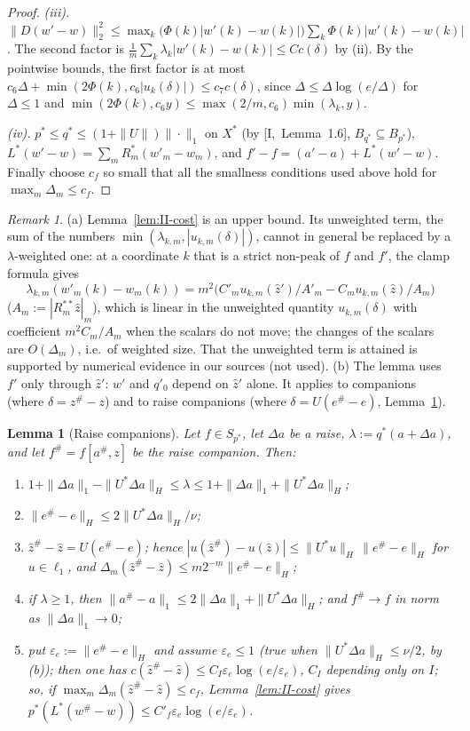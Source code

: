 \documentclass[10pt]{amsart}
\newtheorem{lemma}[theorem]{Lemma}
\theoremstyle{definition}
\theoremstyle{remark}
\newtheorem{remark}[theorem]{Remark}
\newcommand{\zh}{\hat z}
\begin{document}
\begin{proof}
\emph{(iii).}  $\|D(w'-w)\|_2^2\le\max_k\big(\Phi(k)|w'(k)-w(k)|\big)\sum_k
\Phi(k)|w'(k)-w(k)|$.  The second factor is $\frac1m\sum_k\lambda_k|w'(k)-
w(k)|\le C c(\delta)$ by (ii).  By the pointwise bounds, the first factor is
at most $c_6\Delta+\min(2\Phi(k),c_6|u_k(\delta)|)\le c_7c(\delta)$, since
$\Delta\le\Delta\log(e/\Delta)$ for $\Delta\le1$ and $\min(2\Phi(k),c_6y)\le
\max(2/m,c_6)\min(\lambda_k,y)$.

\emph{(iv).}  $p^*\le q^*\le(1+\|U\|)\|\cdot\|_1$ on $X^*$ (by
[I,~Lemma~1.6], $B_{q^*}\subseteq B_{p^*}$), $L^*(w'-w)=\sum_mR_m^*(w'_m-w_m)$,
and $f'-f=(a'-a)+L^*(w'-w)$.  Finally choose $c_f$ so small that all the
smallness conditions used above hold for $\max_m\Delta_m\le c_f$.
\end{proof}

\begin{remark}\label{rem:II-cost}
(a) Lemma~\ref{lem:II-cost} is an upper bound.  Its unweighted term,
the sum of the numbers $\min(\lambda_{k,m},|u_{k,m}(\delta)|)$, cannot in
general be replaced by a $\lambda$-weighted one: at a coordinate $k$ that is a strict non-peak of
$f$ and $f'$, the clamp formula gives
\[
 \lambda_{k,m}(w'_m(k)-w_m(k))=m^2\big(C'_mu_{k,m}(\zh')/A'_m-C_mu_{k,m}(\zh)/
 A_m\big)
\]
\textup{(}$A_m:=|R_m^{**}\zh|_m$\textup{)}, which is linear in the
unweighted quantity $u_{k,m}(\delta)$ with coefficient $m^2C_m/A_m$ when the
scalars do not move; the changes of the scalars are $O(\Delta_m)$, i.e.\ of
weighted size.  That the unweighted term is attained is supported by
numerical evidence in our sources (not used).
(b) The lemma uses $f'$ only through $\zh'$: $w'$ and $q'_0$ depend on $\zh'$
alone.  It applies to companions (where $\delta=z^\#-z$) and to raise
companions (where $\delta=U(e^\#-e)$, Lemma~\ref{lem:II-raise}).
\end{remark}

\begin{lemma}[Raise companions]\label{lem:II-raise}
Let $f\in S_{p^*}$, let $\Delta a$ be a raise, $\lambda:=q^*(a+\Delta a)$, and
let $f^\#=f[a^\#,z]$ be the raise companion.  Then:
\begin{enumerate}
\item[(a)] $1+\|\Delta a\|_1-\|U^*\Delta a\|_H\le\lambda\le1+\|\Delta a\|_1+
\|U^*\Delta a\|_H$;
\item[(b)] $\|e^\#-e\|_H\le2\|U^*\Delta a\|_H/\nu$;
\item[(c)] $\zh^\#-\zh=U(e^\#-e)$; hence $|u(\zh^\#)-u(\zh)|\le\|U^*u\|_H\,
\|e^\#-e\|_H$ for $u\in\ell_1$, and $\Delta_m(\zh^\#-\zh)\le m2^{-m}\|e^\#-e\|_H$;
\item[(d)] if $\lambda\ge1$, then $\|a^\#-a\|_1\le2\|\Delta a\|_1+\|U^*\Delta
a\|_H$; and $f^\#\to f$ in norm as $\|\Delta a\|_1\to0$;
\item[(e)] put $\varepsilon_e:=\|e^\#-e\|_H$ and assume $\varepsilon_e\le1$
\textup{(}true when $\|U^*\Delta a\|_H\le\nu/2$, by \textup{(b))}; then one has
$c(\zh^\#-\zh)\le C_I\varepsilon_e\log(e/\varepsilon_e)$, $C_I$ depending only
on $I$; so, if $\max_m\Delta_m(\zh^\#-\zh)\le c_f$, Lemma~\textup{\ref{lem:II-cost}} gives $p^*(L^*(w^\#-w))\le C'_f\varepsilon_e\log(e/
\varepsilon_e)$.
\end{enumerate}
\end{lemma}
\end{document}
